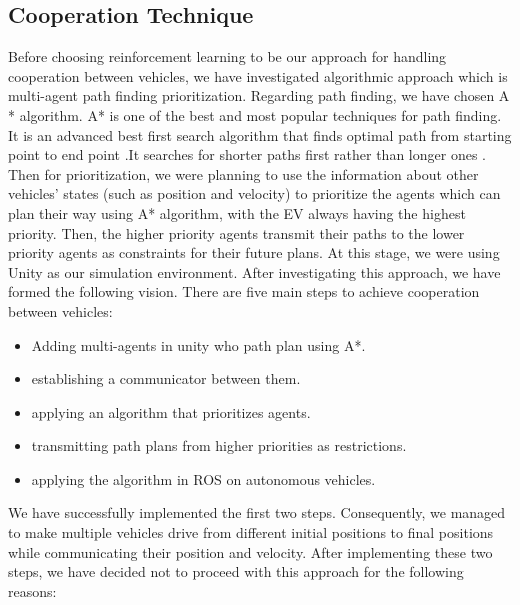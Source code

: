 
\subsection{Cooperation Technique}
\label{des_collab_tech}
Before choosing reinforcement learning to be our approach for handling cooperation between vehicles, we have investigated algorithmic approach which is multi-agent path finding prioritization. Regarding path finding, we have chosen A * algorithm. A* is one of the best and most popular techniques for path finding. It is an advanced best first search algorithm that finds optimal path from starting point to end point .It searches for shorter paths first rather than longer ones \cite{russell2016artificial}. Then for prioritization, we were planning to use the information about other vehicles’ states (such as position and velocity) to prioritize the agents which can plan their way using A* algorithm, with the EV always having the highest priority. Then, the higher priority agents transmit their paths to the lower priority agents as constraints for their future plans. At this stage, we were using Unity as our simulation environment. After investigating this approach, we have formed the following vision. There are five main steps to achieve cooperation between vehicles:
\begin{itemize}
    \item Adding multi-agents in unity who path plan using A*. 
   \item  establishing a communicator between them.  
   \item applying an algorithm that prioritizes agents.
    \item transmitting path plans from higher priorities as restrictions.
    \item applying the algorithm in ROS on autonomous vehicles.

\end{itemize}
We have successfully implemented the first two steps. Consequently, we managed to make multiple vehicles drive from different initial positions to final positions while communicating their position and velocity. After implementing these two steps, we have decided not to proceed with this approach for the following reasons:
